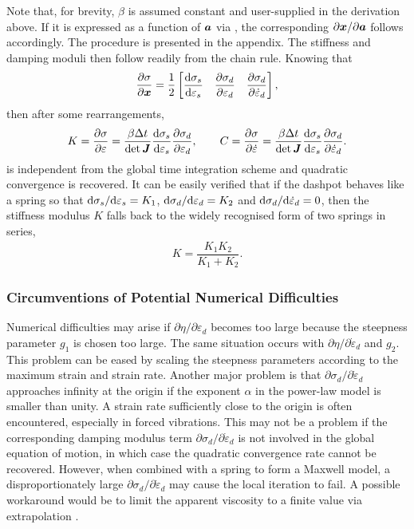 Note that, for brevity, $\beta$ is assumed constant and user-supplied in the derivation above.
If it is expressed as a function of $\bm{a}$ via , the corresponding $\partial\bm{x}/\partial\bm{a}$ follows accordingly.
The procedure is presented in the appendix.
The stiffness and damping moduli then follow readily from the chain rule.
Knowing that
\begin{gather}\label{eq:moduli}
\dfrac{\partial{\sigma}}{\partial{\bm{x}}}=\dfrac{1}{2}\begin{bmatrix}
\dfrac{\mathrm{d}\sigma_s}{\mathrm{d}\varepsilon_s}&\dfrac{\partial{\sigma_d}}{\partial{\varepsilon_d}}&\dfrac{\partial{\sigma_d}}{\partial{\dot\varepsilon_d}}
\end{bmatrix},
\end{gather}
then after some rearrangements,
\begin{gather}\label{eq:tangent}
K=\dfrac{\partial{\sigma}}{\partial{\varepsilon}}=\dfrac{\beta\Delta{}t}{\det{\bm{J}}}\dfrac{\mathrm{d}\sigma_s}{\mathrm{d}\varepsilon_s}\dfrac{\partial{\sigma_d}}{\partial{\varepsilon_d}},\qquad{}C=\dfrac{\partial{\sigma}}{\partial{\dot\varepsilon}}=\dfrac{\beta\Delta{}t}{\det{\bm{J}}}\dfrac{\mathrm{d}\sigma_s}{\mathrm{d}\varepsilon_s}\dfrac{\partial{\sigma_d}}{\partial{\dot\varepsilon_d}}.
\end{gather}
 is independent from the global time integration scheme and quadratic convergence is recovered.
It can be easily verified that if the dashpot behaves like a spring so that $\mathrm{d}\sigma_s/\mathrm{d}\varepsilon_s=K_1$, $\mathrm{d}\sigma_d/\mathrm{d}\varepsilon_d=K_2$ and $\mathrm{d}\sigma_d/\mathrm{d}\dot\varepsilon_d=0$, then the stiffness modulus $K$ falls back to the widely recognised form of two springs in series,
\begin{gather}
K=\dfrac{K_1K_2}{K_1+K_2}.
\end{gather}
\subsubsection{Circumventions of Potential Numerical Difficulties}
Numerical difficulties may arise if $\partial\eta/\partial\varepsilon_d$ becomes too large because the steepness parameter $g_1$ is chosen too large.
The same situation occurs with $\partial\eta/\partial\dot\varepsilon_d$ and $g_2$.
This problem can be eased by scaling the steepness parameters according to the maximum strain and strain rate.
Another major problem is that $\partial\sigma_d/\partial\dot\varepsilon_d$ approaches infinity at the origin if the exponent $\alpha$ in the power-law model is smaller than unity.
A strain rate sufficiently close to the origin is often encountered, especially in forced vibrations.
This may not be a problem if the corresponding damping modulus term $\partial\sigma_d/\partial\dot\varepsilon_d$ is not involved in the global equation of motion, in which case the quadratic convergence rate cannot be recovered.
However, when combined with a spring to form a Maxwell model, a disproportionately large $\partial\sigma_d/\partial\dot\varepsilon_d$ may cause the local iteration to fail.
A possible workaround would be to limit the apparent viscosity to a finite value via extrapolation \cite{Wu1998}.

